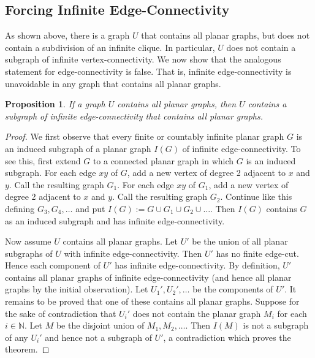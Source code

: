 \documentclass[a4paper,11pt]{article}
\theoremstyle{plain}
\newtheorem{prop}[thm]{Proposition}
\theoremstyle{definition}
\newcommand{\NN}{\mathbb{N}}
\begin{document}
\subsection{Forcing Infinite Edge-Connectivity}
\label{InfiniteEdgeConnectivity}


As shown above, there is a graph $U$ that contains all planar graphs, but does not contain a subdivision of an infinite clique.  In particular, $U$ does not contain a subgraph of infinite vertex-connectivity. We now show that the analogous statement for edge-connectivity is false.  That is, infinite edge-connectivity is unavoidable in any graph that contains all planar graphs. 

\begin{prop}
\label{Universal edge-connectivity}
If a graph $U$ contains all planar graphs, then $U$ contains a subgraph of infinite edge-connectivity that contains all planar graphs.
\end{prop}

\begin{proof}
We first observe that every finite or countably infinite planar graph $G$ is an induced subgraph of a planar graph $I(G)$ of infinite edge-connectivity. To see this, first extend $G$ to a connected planar graph in which $G$ is an induced subgraph. For each edge $xy$ of $G$, add a new vertex of degree 2 adjacent to $x$ and $y$. Call the resulting graph $G_1$. For each edge $xy$ of $G_1$, add a new vertex of degree 2 adjacent to $x$ and $y$. Call the resulting graph $G_2$. Continue like this defining $G_3,G_4, \ldots$ and put $I(G) := G \cup G_1 \cup G_2 \cup \ldots$. Then $I(G)$ contains $G$ as an induced subgraph and has infinite edge-connectivity. 

Now assume $U$ contains all planar graphs. Let $U'$ be the union of all planar subgraphs of $U$ with infinite edge-connectivity. Then $U'$ has no finite edge-cut. Hence each component of $U'$ has infinite edge-connectivity. By definition, $U'$ contains all planar graphs of infinite edge-connectivity (and hence all planar graphs by the initial observation). Let $U_1',U_2', \ldots$ be the components of $U'$. It remains to be proved that one of these contains all planar graphs. Suppose for the sake of contradiction that $U_i'$ does not contain the planar graph $M_i$ for each $i\in\NN$. Let $M$ be the disjoint union of $M_1, M_2,  \ldots$. Then $I(M)$ is not a subgraph of any $U_i'$ and hence not a subgraph of $U'$, a contradiction which proves the theorem.
\end{proof}
\end{document}
